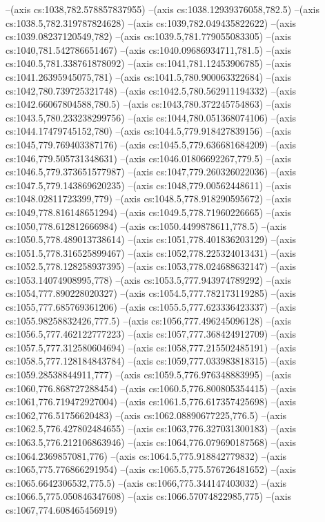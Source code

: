 --(axis cs:1038,782.578857837955)
--(axis cs:1038.12939376058,782.5)
--(axis cs:1038.5,782.319787824628)
--(axis cs:1039,782.049435822622)
--(axis cs:1039.08237120549,782)
--(axis cs:1039.5,781.779055083305)
--(axis cs:1040,781.542786651467)
--(axis cs:1040.09686934711,781.5)
--(axis cs:1040.5,781.338761878092)
--(axis cs:1041,781.12453906785)
--(axis cs:1041.26395945075,781)
--(axis cs:1041.5,780.900063322684)
--(axis cs:1042,780.739725321748)
--(axis cs:1042.5,780.562911194332)
--(axis cs:1042.66067804588,780.5)
--(axis cs:1043,780.372245754863)
--(axis cs:1043.5,780.233238299756)
--(axis cs:1044,780.051368074106)
--(axis cs:1044.17479745152,780)
--(axis cs:1044.5,779.918427839156)
--(axis cs:1045,779.769403387176)
--(axis cs:1045.5,779.636681684209)
--(axis cs:1046,779.505731348631)
--(axis cs:1046.01806692267,779.5)
--(axis cs:1046.5,779.373651577987)
--(axis cs:1047,779.260326022036)
--(axis cs:1047.5,779.143869620235)
--(axis cs:1048,779.00562448611)
--(axis cs:1048.02811723399,779)
--(axis cs:1048.5,778.918290595672)
--(axis cs:1049,778.816148651294)
--(axis cs:1049.5,778.71960226665)
--(axis cs:1050,778.612812666984)
--(axis cs:1050.4499878611,778.5)
--(axis cs:1050.5,778.489013738614)
--(axis cs:1051,778.401836203129)
--(axis cs:1051.5,778.316525899467)
--(axis cs:1052,778.225324013431)
--(axis cs:1052.5,778.128258937395)
--(axis cs:1053,778.024688632147)
--(axis cs:1053.14074908995,778)
--(axis cs:1053.5,777.943974789292)
--(axis cs:1054,777.890228020327)
--(axis cs:1054.5,777.782173119285)
--(axis cs:1055,777.685769361206)
--(axis cs:1055.5,777.623336423337)
--(axis cs:1055.98258832426,777.5)
--(axis cs:1056,777.496245096128)
--(axis cs:1056.5,777.462122777223)
--(axis cs:1057,777.368424912709)
--(axis cs:1057.5,777.312580604694)
--(axis cs:1058,777.215502485191)
--(axis cs:1058.5,777.128184843784)
--(axis cs:1059,777.033983818315)
--(axis cs:1059.28538844911,777)
--(axis cs:1059.5,776.976348883995)
--(axis cs:1060,776.868727288454)
--(axis cs:1060.5,776.800805354415)
--(axis cs:1061,776.719472927004)
--(axis cs:1061.5,776.617357425698)
--(axis cs:1062,776.51756620483)
--(axis cs:1062.08890677225,776.5)
--(axis cs:1062.5,776.427802484655)
--(axis cs:1063,776.327031300183)
--(axis cs:1063.5,776.212106863946)
--(axis cs:1064,776.079690187568)
--(axis cs:1064.2369857081,776)
--(axis cs:1064.5,775.918842779832)
--(axis cs:1065,775.776866291954)
--(axis cs:1065.5,775.576726481652)
--(axis cs:1065.6642306532,775.5)
--(axis cs:1066,775.344147403032)
--(axis cs:1066.5,775.050846347608)
--(axis cs:1066.57074822985,775)
--(axis cs:1067,774.608465456919)
